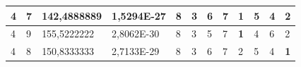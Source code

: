\documentclass[conference]{IEEEtran}
\begin{document}
\begin{table}[]
\begin{tabular}{|llll|llllllll|}
\multicolumn{1}{|l|}{4}                                                              & \multicolumn{1}{l|}{7}                                                                 & \multicolumn{1}{l|}{142,4888889}                                                           & 1,5294E-27                              & \multicolumn{1}{l|}{8}                                                           & \multicolumn{1}{l|}{3}                                                           & \multicolumn{1}{l|}{6}                                                           & \multicolumn{1}{l|}{7}                                                           & \multicolumn{1}{l|}{\textbf{1}}                                                  & \multicolumn{1}{l|}{5}                                                           & \multicolumn{1}{l|}{4}                                                           & 2                                   \\ \hline
\multicolumn{1}{|l|}{4}                                                              & \multicolumn{1}{l|}{9}                                                                 & \multicolumn{1}{l|}{155,5222222}                                                           & 2,8062E-30                              & \multicolumn{1}{l|}{8}                                                           & \multicolumn{1}{l|}{3}                                                           & \multicolumn{1}{l|}{5}                                                           & \multicolumn{1}{l|}{7}                                                           & \multicolumn{1}{l|}{\textbf{1}}                                                  & \multicolumn{1}{l|}{4}                                                           & \multicolumn{1}{l|}{6}                                                           & 2                                   \\ \hline
\multicolumn{1}{|l|}{4}                                                              & \multicolumn{1}{l|}{8}                                                                 & \multicolumn{1}{l|}{150,8333333}                                                           & 2,7133E-29                              & \multicolumn{1}{l|}{8}                                                           & \multicolumn{1}{l|}{3}                                                           & \multicolumn{1}{l|}{6}                                                           & \multicolumn{1}{l|}{7}                                                           & \multicolumn{1}{l|}{2}                                                           & \multicolumn{1}{l|}{5}                                                           & \multicolumn{1}{l|}{4}                                                           & \textbf{1}                          \\ \hline

\end{tabular}
\end{table}
\end{document}
